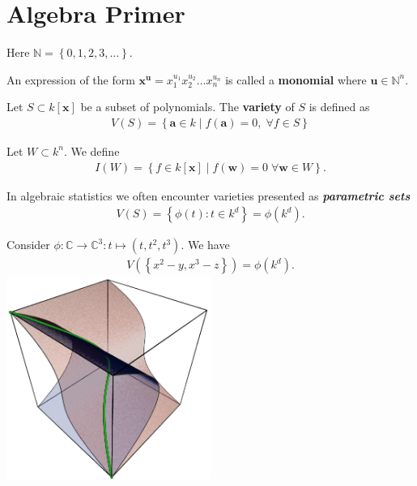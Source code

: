 
\section{Algebra Primer}

Here \( \mathbb{N} = \left\{ 0,1,2,3, ... \right\} \).

\begin{defi}[Monomial]
  An expression of the form \(  \mathbf x^{\mathbf u} = x_1^{u_1} x_2^{u_2} \dots x_n^{u_n} \) is called a \textbf{monomial} where \( \mathbf u \in \mathbb N^n \).
\end{defi}

\begin{defi}[Variety]
  Let \( S \subset k[\mathbf x] \) be a subset of polynomials. The \textbf{variety} of \( S \) is defined as
  \begin{align*}
    V(S) = \left\{ \mathbf a \in k \mid f(\mathbf a) = 0, \; \forall f \in S \right\}
  \end{align*}
\end{defi}

\begin{defi}
  Let \( W \subset k^n \). We define
  \begin{align*}
    I(W) = \left\{ f \in k[\mathbf x] \mid f(\mathbf w) = 0 \; \forall \mathbf w \in W \right\}.
  \end{align*}
\end{defi}

In algebraic statistics we often encounter varieties presented as \emph{\textbf{parametric sets}}
\begin{align*}
  V(S) = \left\{ \phi(t) : t \in k^d \right\} = \phi(k^d).
\end{align*}

\begin{eg}
  Consider \( \phi: \mathbb{C} \to \mathbb{C}^3: t \mapsto (t,t^2,t^3) \). We have 
  \begin{align*}
    V(\left\{ x^2 - y, x^3 - z \right\}) = \phi(k^d).
  \end{align*}
  \includegraphics*[width=0.5\textwidth]{assets/Twisted_cubic_curve.png}
\end{eg}


